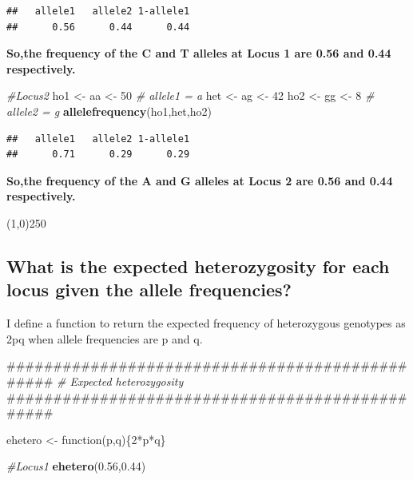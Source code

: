 \documentclass[]{article}
\newenvironment{Shaded}{\begin{snugshade}}{\end{snugshade}}
\newcommand{\KeywordTok}[1]{\textcolor[rgb]{0.13,0.29,0.53}{\textbf{{#1}}}}
\newcommand{\DecValTok}[1]{\textcolor[rgb]{0.00,0.00,0.81}{{#1}}}
\newcommand{\FloatTok}[1]{\textcolor[rgb]{0.00,0.00,0.81}{{#1}}}
\newcommand{\StringTok}[1]{\textcolor[rgb]{0.31,0.60,0.02}{{#1}}}
\newcommand{\CommentTok}[1]{\textcolor[rgb]{0.56,0.35,0.01}{\textit{{#1}}}}
\newcommand{\NormalTok}[1]{{#1}}
\begin{document}
\begin{verbatim}
##   allele1   allele2 1-allele1 
##      0.56      0.44      0.44
\end{verbatim}

\textbf{So,the frequency of the C and T alleles at Locus 1 are 0.56 and
0.44 respectively.}

\begin{Shaded}
\begin{Highlighting}[]
\CommentTok{#Locus2}
\NormalTok{ho1 <-}\StringTok{ }\NormalTok{aa <-}\StringTok{ }\DecValTok{50}     \CommentTok{# allele1 = a}
\NormalTok{het <-}\StringTok{ }\NormalTok{ag <-}\StringTok{ }\DecValTok{42}
\NormalTok{ho2 <-}\StringTok{ }\NormalTok{gg <-}\StringTok{ }\DecValTok{8}      \CommentTok{# allele2 = g}
\KeywordTok{allelefrequency}\NormalTok{(ho1,het,ho2)}
\end{Highlighting}
\end{Shaded}

\begin{verbatim}
##   allele1   allele2 1-allele1 
##      0.71      0.29      0.29
\end{verbatim}

\textbf{So,the frequency of the A and G alleles at Locus 2 are 0.56 and
0.44 respectively.}\\

\begin{center}
\line(1,0){250}
\end{center}

\subsection{What is the expected heterozygosity for each locus given the
allele
frequencies?}\label{what-is-the-expected-heterozygosity-for-each-locus-given-the-allele-frequencies}

I define a function to return the expected frequency of heterozygous
genotypes as 2pq when allele frequencies are p and q.

\begin{Shaded}
\begin{Highlighting}[]
\NormalTok{################################################}
\CommentTok{# Expected heterozygosity}
\NormalTok{################################################}

\NormalTok{ehetero <-}\StringTok{ }\NormalTok{function(p,q)\{}\DecValTok{2}\NormalTok{*p*q\}}

\CommentTok{#Locus1}
\KeywordTok{ehetero}\NormalTok{(}\FloatTok{0.56}\NormalTok{,}\FloatTok{0.44}\NormalTok{)}
\end{Highlighting}
\end{Shaded}
\end{document}
